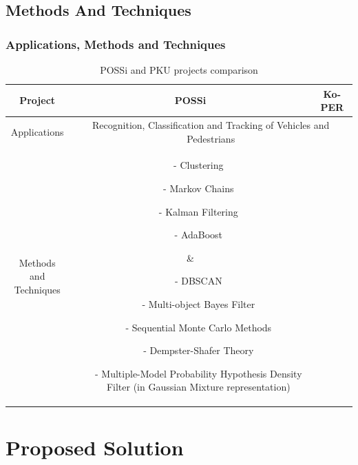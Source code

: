 \documentclass[table]{beamer}
\begin{document}
\subsection*{Methods And Techniques}
\frame
{
	\frametitle{Applications, Methods and Techniques}
	
	\scriptsize{
	\begin{table}	
	\begin{tabular}{|c|c|c|}
	\hline
	Project & POSSi & Ko-PER \\
	\hline
	Applications & \multicolumn{2}{c|}{\parbox{6cm}{Recognition, Classification and Tracking of Vehicles and Pedestrians}} \\
	\hline
	\parbox{2.5cm}{Methods and \\Techniques}
	& \parbox{2.5cm}{\begin{itemize}[leftmargin=.07in]
		\item[-] Clustering
		\item[-] Markov Chains
		\item[-] Kalman Filtering
		\item[-] AdaBoost
	\end{itemize}
	}
	& \parbox{3.5cm}{
	\begin{itemize}[leftmargin=.07in]
		\item[-] DBSCAN
		\item[-] Multi-object Bayes Filter
		\item[-] Sequential Monte Carlo Methods
		\item[-] Dempster-Shafer Theory
		\item[-] Multiple-Model Probability Hypothesis Density Filter (in Gaussian Mixture representation)
	\end{itemize}
	}\\
	\hline
	
	\end{tabular}
	\caption{POSSi and PKU projects comparison}	
	\end{table}
	}
}
\section{Proposed Solution}
\end{document}

